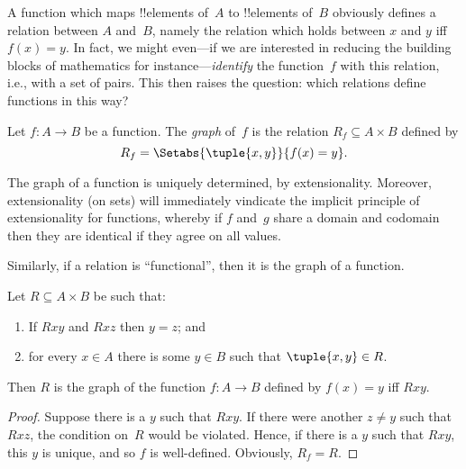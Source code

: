 \documentclass[../../../include/open-logic-section]{subfiles}
\begin{document}

\begin{explain} 
A function which maps !!{element}s of~$A$ to !!{element}s of~$B$
obviously defines a relation between $A$ and~$B$, namely the relation
which holds between $x$ and $y$ iff $f(x) = y$.  In fact, we might
even---if we are interested in reducing the building blocks of
mathematics for instance---\emph{identify} the function~$f$ with this
relation, i.e., with a set of pairs.  This then raises the question:
which relations define functions in this way?
\end{explain}

\begin{defn} Let $f\colon A \to B$ be a function.
The \emph{graph} of~$f$ is the relation $R_f \subseteq A \times B$
defined by
\[
R_f = \Setabs{\tuple{x,y}}{f(x) = y}.
\]
\end{defn}

\begin{explain}
The graph of a function is uniquely determined, by extensionality.
Moreover, extensionality (on sets) will immediately vindicate the
implicit principle of extensionality for functions,
whereby if $f$ and~$g$ share a domain and codomain then they are
identical if they agree on all values. 

Similarly, if a relation is ``functional'', then it is the graph of a function. 
\end{explain}

\begin{prop}
Let $R \subseteq A \times B$ be such that:
\begin{enumerate}
\item If $Rxy$ and $Rxz$ then $y = z$; and 
\item for every $x \in A$ there is some $y \in B$ such that $\tuple{x,
y} \in R$.  
\end{enumerate}
Then $R$ is the graph of the function $f\colon A \to B$ defined by
$f(x) = y$ iff $Rxy$. 
\end{prop}

\begin{proof}
Suppose there is a $y$ such that $Rxy$.  If there were another $z \neq
y$ such that $Rxz$, the condition on~$R$ would be violated. Hence, if
there is a $y$ such that $Rxy$, this $y$ is unique, and so $f$ is
well-defined.  Obviously, $R_f = R$.
\end{proof}
\end{document}
